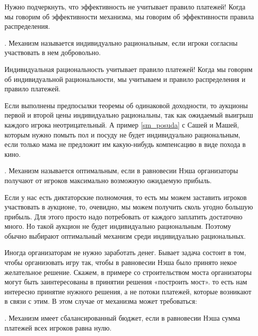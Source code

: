 Нужно подчеркнуть, что эффективность не учитывает правило платежей! Когда мы говорим об эффективности механизма, мы говорим об эффективности правила распределения.

\begin{mydef}
. Механизм называется индивидуально рациональным, если игроки согласны участвовать в нем добровольно.
\end{mydef}

Индивидуальная рациональность учитывает правило платежей! Когда мы говорим об индивидуальной рациональности, мы учитываем и правило распределения и правило платежей.

\begin{myex} Если выполнены предпосылки теоремы об одинаковой доходности, то аукционы первой и второй цены индивидуально рациональны, так как ожидаемый выигрыш каждого игрока неотрицательный. А пример \ref{sm_posuda} с Сашей и Машей, которым нужно помыть пол и посуду не будет индивидуально рациональным, если только мама не предложит им какую-нибудь компенсацию в виде похода в кино.
\end{myex}

\begin{mydef} . Механизм называется оптимальным, если в равновесии Нэша организаторы получают от игроков максимально возможную ожидаемую прибыль.
\end{mydef}

Если у нас есть диктаторские полномочия, то есть мы можем заставить игроков участвовать в аукционе, то, очевидно, мы можем получить сколь угодно большую прибыль. Для этого просто надо потребовать от каждого заплатить достаточно много. Но такой аукцион не будет индивидуально рациональным. Поэтому обычно выбирают оптимальный механизм среди индивидуально рациональных.

Иногда организаторам не нужно заработать денег. Бывает задача состоит в том, чтобы организовать игру так, чтобы в равновесии Нэша было принято некое желательное решение. Скажем, в примере со строительством моста организаторы могут быть заинтересованы в принятии решения «построить мост». то есть нам интересно принятие нужного решения, а не потоки платежей, которые возникают в связи с этим. В этом случае от механизма может требоваться:

\begin{mydef} . Механизм имеет сбалансированный бюджет, если в равновесии Нэша сумма платежей всех игроков равна нулю.
\end{mydef}

